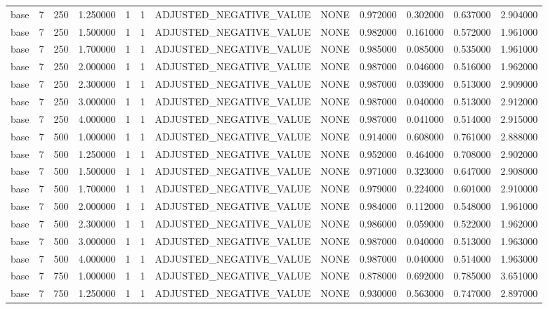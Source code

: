\begin{tabular}{lrrrllllrrrr}
base & 7 & 250 & 1.250000 & 1 & 1 & ADJUSTED_NEGATIVE_VALUE & NONE & 0.972000 & 0.302000 & 0.637000 & 2.904000 \\
base & 7 & 250 & 1.500000 & 1 & 1 & ADJUSTED_NEGATIVE_VALUE & NONE & 0.982000 & 0.161000 & 0.572000 & 1.961000 \\
base & 7 & 250 & 1.700000 & 1 & 1 & ADJUSTED_NEGATIVE_VALUE & NONE & 0.985000 & 0.085000 & 0.535000 & 1.961000 \\
base & 7 & 250 & 2.000000 & 1 & 1 & ADJUSTED_NEGATIVE_VALUE & NONE & 0.987000 & 0.046000 & 0.516000 & 1.962000 \\
base & 7 & 250 & 2.300000 & 1 & 1 & ADJUSTED_NEGATIVE_VALUE & NONE & 0.987000 & 0.039000 & 0.513000 & 2.909000 \\
base & 7 & 250 & 3.000000 & 1 & 1 & ADJUSTED_NEGATIVE_VALUE & NONE & 0.987000 & 0.040000 & 0.513000 & 2.912000 \\
base & 7 & 250 & 4.000000 & 1 & 1 & ADJUSTED_NEGATIVE_VALUE & NONE & 0.987000 & 0.041000 & 0.514000 & 2.915000 \\
base & 7 & 500 & 1.000000 & 1 & 1 & ADJUSTED_NEGATIVE_VALUE & NONE & 0.914000 & 0.608000 & 0.761000 & 2.888000 \\
base & 7 & 500 & 1.250000 & 1 & 1 & ADJUSTED_NEGATIVE_VALUE & NONE & 0.952000 & 0.464000 & 0.708000 & 2.902000 \\
base & 7 & 500 & 1.500000 & 1 & 1 & ADJUSTED_NEGATIVE_VALUE & NONE & 0.971000 & 0.323000 & 0.647000 & 2.908000 \\
base & 7 & 500 & 1.700000 & 1 & 1 & ADJUSTED_NEGATIVE_VALUE & NONE & 0.979000 & 0.224000 & 0.601000 & 2.910000 \\
base & 7 & 500 & 2.000000 & 1 & 1 & ADJUSTED_NEGATIVE_VALUE & NONE & 0.984000 & 0.112000 & 0.548000 & 1.961000 \\
base & 7 & 500 & 2.300000 & 1 & 1 & ADJUSTED_NEGATIVE_VALUE & NONE & 0.986000 & 0.059000 & 0.522000 & 1.962000 \\
base & 7 & 500 & 3.000000 & 1 & 1 & ADJUSTED_NEGATIVE_VALUE & NONE & 0.987000 & 0.040000 & 0.513000 & 1.963000 \\
base & 7 & 500 & 4.000000 & 1 & 1 & ADJUSTED_NEGATIVE_VALUE & NONE & 0.987000 & 0.040000 & 0.514000 & 1.963000 \\
base & 7 & 750 & 1.000000 & 1 & 1 & ADJUSTED_NEGATIVE_VALUE & NONE & 0.878000 & 0.692000 & 0.785000 & 3.651000 \\
base & 7 & 750 & 1.250000 & 1 & 1 & ADJUSTED_NEGATIVE_VALUE & NONE & 0.930000 & 0.563000 & 0.747000 & 2.897000 \\

\end{tabular}
